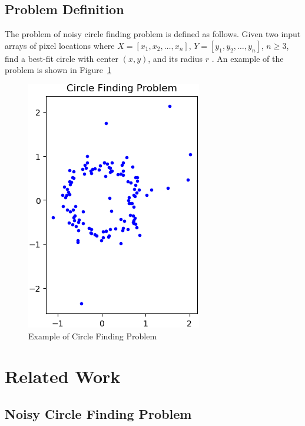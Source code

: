 \documentclass[10pt,twocolumn,letterpaper]{article}
\begin{document}
\subsection{Problem Definition}

The problem of noisy circle finding problem is defined as follows. Given two input arrays of pixel locations where $X = [x_{1}, x_{2}, \dots, x_{n}]$, $Y = [y_{1}, y_{2}, \dots, y_{n}]$, $n \geq 3$, find a best-fit circle with center $(x, y)$, and its radius $r$ \cite{NoisyCircleFindingProblem}. An example of the problem is shown in Figure~\ref{fig:circle_finding}

\begin{figure}[!ht]
   \begin{center}
      \includegraphics[width=0.6\linewidth]{./images/noisy_circle.png}
   \end{center}
   \caption{Example of Circle Finding Problem}
   \label{fig:circle_finding}
\end{figure}


\section{Related Work}
\label{section:related_work}


\subsection{Noisy Circle Finding Problem}
\end{document}
